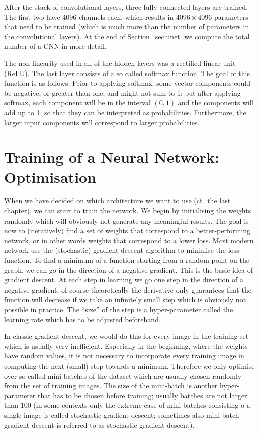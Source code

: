 After the stack of convolutional layers, three fully connected layers are
trained. The first two have 4096 channels each, which results in
$4096 \times 4096$ parameters that need to be trained (which is much more than
the number of parameters in the convolutional layers). At the end of
Section~\ref{sec:unet} we compute the total number of a CNN in more detail.

The non-linearity used in all of the hidden layers was a rectified linear unit
(ReLU). The last layer consists of a so called softmax function. The goal of
this function is as follows. Prior to applying softmax, some vector components
could be negative, or greater than one; and might not sum to 1; but after
applying softmax, each component will be in the interval $(0,1)$ and the
components will add up to 1, so that they can be interpreted as
probabilities. Furthermore, the larger input components will correspond to
larger probabilities.

\section{Training of a Neural Network: Optimisation}%
\label{sec:train_cnn}
When we have decided on which architecture we want to use (cf.~the last
chapter), we can start to train the network. We begin by initialising the
weights randomly which will obviously not generate any meaningful results.  The
goal is now to (iteratively) find a set of weights that correspond to a
better-performing network, or in other words weights that correspond to a lower
loss. Most modern network use the (stochastic) gradient descent algorithm to
minimise the loss function. To find a minimum of a function starting from a
random point on the graph, we can go in the direction of a negative gradient.
This is the basic idea of gradient descent. At each step in learning we go one
step in the direction of a negative gradient; of course theoretically the
derivative only guarantees that the function will decrease if we take an
infinitely small step which is obviously not possible in practice. The ``size''
of the step is a hyper-parameter called the learning rate which has to be
adjusted beforehand.

In classic gradient descent, we would do this for every image in the training
set which is usually very inefficient. Especially in the beginning, where the
weights have random values, it is not necessary to incorporate every training
image in computing the next (small) step towards a minimum. Therefore we only
optimise over so called mini-batches of the dataset which are usually chosen
randomly from the set of training images. The size of the mini-batch is another
hyper-parameter that has to be chosen before training; usually batches are not
larger than 100 (in some contexts only the extreme case of mini-batches
consisting o a single image is called stochastic gradient descent; sometimes
also mini-batch gradient descent is referred to as stochastic gradient descent).

